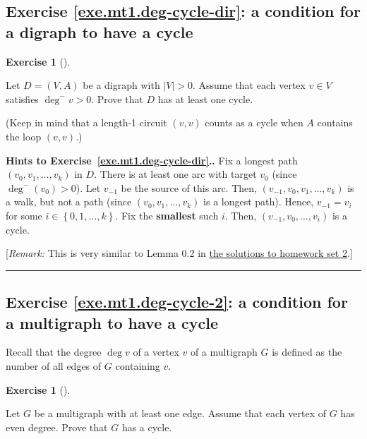 \documentclass[numbers=enddot,12pt,final,onecolumn,notitlepage]{scrartcl}%
\newcounter{exer}
\theoremstyle{definition}
\newtheorem{exmp}[exer]{Exercise}
\newenvironment{exercise}[1][]
{\begin{exmp}[#1]\begin{leftbar}}
{\end{leftbar}\end{exmp}}
\newenvironment{proof}[1][Proof]{\noindent\textbf{#1.} }{\ \rule{0.5em}{0.5em}}
\newcommand{\set}[1]{\left\{ #1 \right\}}
\newcommand{\abs}[1]{\left| #1 \right|}
\newcommand{\tup}[1]{\left( #1 \right)}
\begin{document}
\subsection{Exercise \ref{exe.mt1.deg-cycle-dir}: a condition for a
digraph to have a cycle}

\begin{exercise} \label{exe.mt1.deg-cycle-dir}
Let $D = \tup{V, A}$ be a digraph with $\abs{V} > 0$. Assume
that each vertex $v \in V$ satisfies $\deg^- v > 0$. Prove that
$D$ has at least one cycle.

(Keep in mind that a length-1 circuit $\tup{v, v}$ counts as a cycle
when $A$ contains the loop $\tup{v, v}$.)
\end{exercise}

\begin{proof}[Hints to Exercise~\ref{exe.mt1.deg-cycle-dir}.]
Fix a longest path $\tup{v_0, v_1, \ldots, v_k}$ in $D$.
There is at least one arc with target
$v_0$ (since $\deg^- \tup{v_0} > 0$). Let $v_{-1}$ be the source of
this arc. Then, $\tup{v_{-1}, v_0, v_1, \ldots, v_k}$ is a walk, but
not a path (since $\tup{v_0, v_1, \ldots, v_k}$ is a longest path).
Hence, $v_{-1} = v_i$ for some $i \in \set{0, 1, \ldots, k}$.
Fix the \textbf{smallest} such $i$.
Then, $\tup{v_{-1}, v_0, \ldots, v_i}$ is a cycle.

[\textit{Remark:} This is very similar to Lemma 0.2 in
\href{http://www-users.math.umn.edu/~dgrinber/5707s17/hw2s.pdf}{the solutions to homework set 2}.]
\end{proof}

\subsection{Exercise \ref{exe.mt1.deg-cycle-2}: a condition for a
multigraph to have a cycle}

Recall that the degree $\deg v$ of a vertex $v$ of a multigraph $G$
is defined as the number of all edges of $G$ containing $v$.

\begin{exercise} \label{exe.mt1.deg-cycle-2}
Let $G$ be a multigraph with at least one edge.
Assume that each vertex of $G$ has even degree.
Prove that $G$ has a cycle.
\end{exercise}
\end{document}
